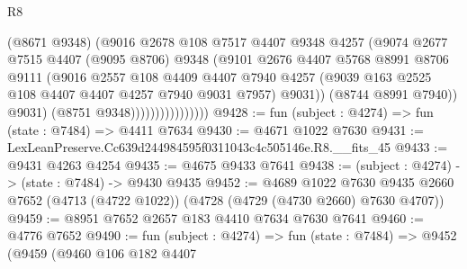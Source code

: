 \begin{lexlean}{R8}
\begin{coremodule}
                                  (@8671 @9348)
                                  (@9016
                                    @2678
                                    @108
                                    @7517
                                    @4407
                                    @9348
                                    @4257
                                    (@9074
                                      @2677
                                      @7515
                                      @4407
                                      (@9095 @8706)
                                      @9348
                                      (@9101
                                        @2676
                                        @4407
                                        @5768
                                        @8991
                                        @8706
                                        @9111
                                        (@9016
                                          @2557
                                          @108
                                          @4409
                                          @4407
                                          @7940
                                          @4257
                                          (@9039
                                            @163
                                            @2525
                                            @108
                                            @4407
                                            @4407
                                            @4257
                                            @7940
                                            @9031
                                            @7957)
                                          @9031))
                                      (@8744 @8991 @7940))
                                    @9031)
                                  (@8751 @9348))))))))))))))))
@9428 := fun (subject : @4274) => fun (state : @7484) => @4411 @7634
@9430 := @4671 @1022 @7630
@9431 := LexLeanPreserve.Cc639d244984595f0311043c4c505146e.R8.__fits_45
@9433 := @9431 @4263 @4254
@9435 := @4675 @9433 @7641
@9438 := (subject : @4274) -> (state : @7484) -> @9430 @9435
@9452 := @4689
    @1022
    @7630
    @9435
    @2660
    @7652
    (@4713 (@4722 @1022))
    (@4728 (@4729 (@4730 @2660) @7630 @4707))
@9459 := @8951 @7652 @2657 @183 @4410 @7634 @7630 @7641
@9460 := @4776 @7652
@9490 := fun (subject : @4274) =>
  fun (state : @7484) =>
  @9452
    (@9459
      (@9460
        @106
        @182
        @4407

\end{coremodule}
\end{lexlean}
